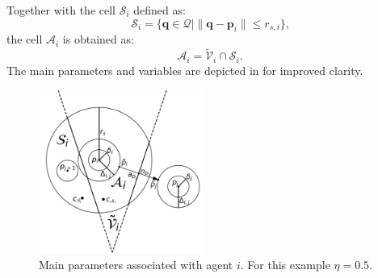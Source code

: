         Together with the cell $\mathcal{S}_i$ defined as: 
        \begin{equation}
            \label{eqn:cell_s}
            \mathcal{S}_i = \{\mathbf{q} \in \mathcal{Q} | \| \mathbf{q} - \mathbf{p}_i \| \leq r_{s,i}\}\text{,}
        \end{equation}
        the cell $\mathcal{A}_i$ is obtained as:
        \begin{equation}
            \label{eqn:cell_a}
            \mathcal{A}_i = \tilde{\mathcal{V}}_i \cap \mathcal{S}_i \text{.}
        \end{equation}
        The main parameters and variables are depicted in  for improved clarity. 

        \begin{figure}[htbp]
            \centering
            \includegraphics[width=0.48\textwidth, height=0.48\textwidth]{./fig/photos/cells_example.png}
            \caption{
                Main parameters associated with agent $i$. For this example $\eta = 0.5$.
            }
            \label{fig:cells_example}
        \end{figure}

